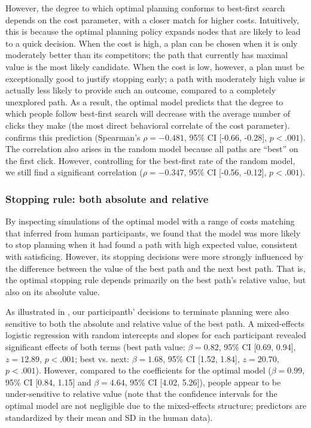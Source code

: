 However, the degree to which optimal planning conforms to best-first search depends on the cost parameter, with a closer match for higher costs.
Intuitively, this is because the optimal planning policy expands nodes that are likely to lead to a quick decision. When the cost is high, a plan can be chosen when it is only moderately better than its competitors; the path that currently has maximal value is the most likely candidate. When the cost is low, however, a plan must be exceptionally good to justify stopping early; a path with moderately high value is actually less likely to provide such an outcome, compared to a completely unexplored path.
As a result, the optimal model predicts that the degree to which people follow best-first search will decrease with the average number of clicks they make (the most direct behavioral correlate of the cost parameter).  confirms this prediction (Spearman's $\rho=-0.481$, 95\% CI [-0.66, -0.28], $p < .001$). The correlation also arises in the random model because all paths are ``best'' on the first click. However, controlling for the best-first rate of the random model, we still find a significant correlation ($\rho=-0.347$, 95\% CI [-0.56, -0.12], $p < .001$).

\subsubsection{Stopping rule: both absolute and relative}\label{sec:planning-stopping}
By inspecting simulations of the optimal model with a range of costs matching that inferred from human participants, we found that the model was more likely to stop planning when it had found a path with high expected value, consistent with satisficing. However, its stopping decisions were more strongly influenced by the difference between the value of the best path and the next best path. That is, the optimal stopping rule depends primarily on the best path's relative value, but also on its absolute value.

As illustrated in , our participantb' decisions to terminate planning were also sensitive to both the absolute and relative value of the best path. A mixed-effects logistic regression with random intercepts and slopes for each participant revealed significant effects of both terms (best path value: $\beta = 0.82$, 95\% CI [0.69, 0.94], $z = 12.89$, $p < .001$; best vs. next: $\beta = 1.68$, 95\% CI [1.52, 1.84], $z = 20.70$, $p < .001$). However, compared to the coefficients for the optimal model ($\beta = 0.99$, 95\% CI [0.84, 1.15] and $\beta = 4.64$, 95\% CI [4.02, 5.26]), people appear to be under-sensitive to relative value (note that the confidence intervals for the optimal model are not negligible due to the mixed-effects structure; predictors are standardized by their mean and SD in the human data).

